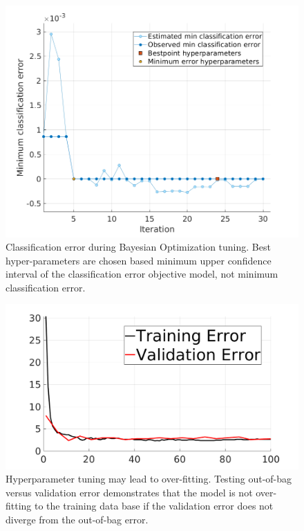 \documentclass[journal,onecolumn]{IEEEtran}
\begin{document}
			\begin{figure}[H]
				\centering
				\includegraphics[width=0.75\linewidth]{figures/c2_min_class_error}
				\caption[RDF Training Classification Error]{Classification error during Bayesian Optimization tuning. Best hyper-parameters are chosen based minimum upper confidence interval of the classification error objective model, not minimum classification error.}
				\label{fig:c2_min_class_error}
			\end{figure}
		
			\begin{figure}[H]
				\centering
				\includegraphics[width=0.75\linewidth]{figures/train_vs_valid_overfit_test2}
				\caption[Training vs Validation Error]{Hyperparameter tuning may lead to over-fitting. Testing out-of-bag versus validation error demonstrates that the model is not over-fitting to the training data base if the validation error does not diverge from the out-of-bag error.}
				\label{fig:train_vs_valid_overfit_test2}
			\end{figure}
		
\end{document}
